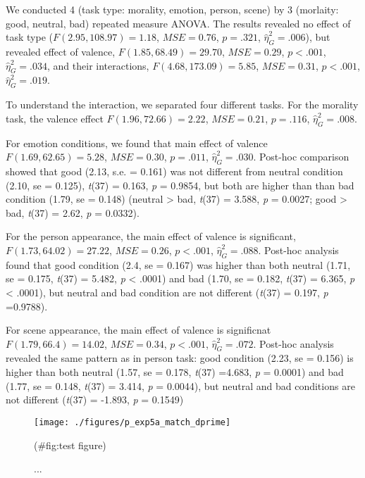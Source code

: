 \documentclass[man]{apa6}
\begin{document}
We conducted 4 (task type: morality, emotion, person, scene) by 3 (morlaity: good, neutral, bad) repeated measure ANOVA. The results revealed no effect of task type (\(F(2.95, 108.97) = 1.18\), \(\mathit{MSE} = 0.76\), \(p = .321\), \(\hat{\eta}^2_G = .006\)), but revealed effect of valence, \(F(1.85, 68.49) = 29.70\), \(\mathit{MSE} = 0.29\), \(p < .001\), \(\hat{\eta}^2_G = .034\), and their interactions, \(F(4.68, 173.09) = 5.85\), \(\mathit{MSE} = 0.31\), \(p < .001\), \(\hat{\eta}^2_G = .019\).

To understand the interaction, we separated four different tasks. For the morality task, the valence effect \(F(1.96, 72.66) = 2.22\), \(\mathit{MSE} = 0.21\), \(p = .116\), \(\hat{\eta}^2_G = .008\).

For emotion conditions, we found that main effect of valence \(F(1.69, 62.65) = 5.28\), \(\mathit{MSE} = 0.30\), \(p = .011\), \(\hat{\eta}^2_G = .030\). Post-hoc comparison showed that good (2.13, s.e. = 0.161) was not different from neutral condition (2.10, se = 0.125), \emph{t}(37) = 0.163, \emph{p} = 0.9854, but both are higher than than bad condition (1.79, se = 0.148) (neutral \textgreater{} bad, \emph{t}(37) = 3.588, \emph{p} = 0.0027; good \textgreater{} bad, \emph{t}(37) = 2.62, \emph{p} = 0.0332).

For the person appearance, the main effect of valence is significant, \(F(1.73, 64.02) = 27.22\), \(\mathit{MSE} = 0.26\), \(p < .001\), \(\hat{\eta}^2_G = .088\). Post-hoc analysis found that good condition (2.4, se = 0.167) was higher than both neutral (1.71, se = 0.175, \emph{t}(37) = 5.482, \emph{p} \textless{} .0001) and bad (1.70, se = 0.182, \emph{t}(37) = 6.365, \emph{p} \textless{} .0001), but neutral and bad condition are not different (\emph{t}(37) = 0.197, \emph{p} =0.9788).

For scene appearance, the main effect of valence is significnat \(F(1.79, 66.4) = 14.02\), \(\mathit{MSE} = 0.34\), \(p < .001\), \(\hat{\eta}^2_G = .072\). Post-hoc analysis revealed the same pattern as in person task: good condition (2.23, se = 0.156) is higher than both neutral (1.57, se = 0.178, \emph{t}(37) =4.683, \emph{p} = 0.0001) and bad (1.77, se = 0.148, \emph{t}(37) = 3.414, \emph{p} = 0.0044), but neutral and bad conditions are not different (\emph{t}(37) = -1.893, \emph{p} = 0.1549)

\begin{figure}

{\centering \texttt{[image: ./figures/p\_exp5a\_match\_dprime]} 

}

\caption{...}(\#fig:test figure)
\end{figure}
\end{document}
